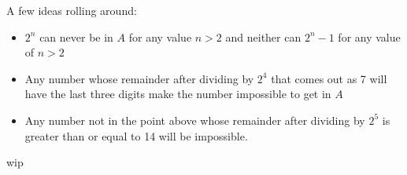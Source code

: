 \documentclass{article}
\begin{document}
A few ideas rolling around:
\begin{itemize}
    \item $2^n$ can never be in $A$ for any value $n > 2$ and neither can $2^n-1$ for any value of $n > 2$
    \item Any number whose remainder after dividing by $2^4$ that comes out as 7 will have the last three digits make the number impossible to get in $A$
    \item Any number not in the point above whose remainder after dividing by $2^5$ is greater than or equal to 14 will be impossible.
\end{itemize}

\par

wip
\end{document}

